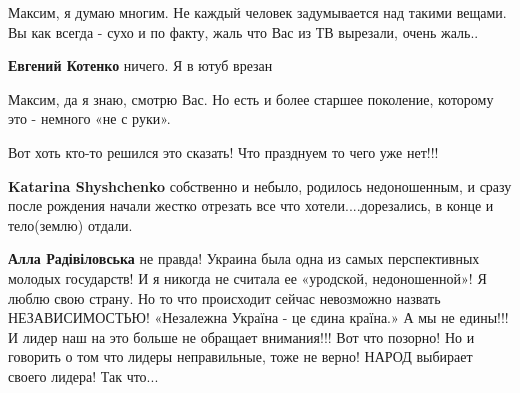 \begin{itemize}
\begin{itemize}
Максим, я думаю многим. Не каждый человек задумывается над такими вещами.
Вы как всегда - сухо и по факту, жаль что Вас из ТВ вырезали, очень жаль..

 
\textbf{Евгений Котенко} ничего. Я в ютуб врезан

 
Максим, да я знаю, смотрю Вас. Но есть и более старшее поколение, которому это - немного «не с руки».
\end{itemize}


Вот хоть кто-то решился это сказать! Что празднуем то чего уже нет!!!

\begin{itemize}
 
\textbf{Katarina Shyshchenko} собственно и небыло, родилось недоношенным, и сразу после рождения начали жестко отрезать все что хотели....дорезались, в конце и тело(землю) отдали.

 
\textbf{Алла Радівіловська} не правда! Украина была одна из самых перспективных молодых государств! И я никогда не считала ее «уродской, недоношенной»! Я люблю свою страну. Но то что происходит сейчас невозможно назвать НЕЗАВИСИМОСТЬЮ!
«Незалежна Україна - це єдина країна.» А мы не едины!!! И лидер наш на это больше не обращает внимания!!! Вот что позорно! Но и говорить о том что лидеры неправильные, тоже не верно! НАРОД выбирает своего лидера! Так что...
\end{itemize}


\end{itemize}
